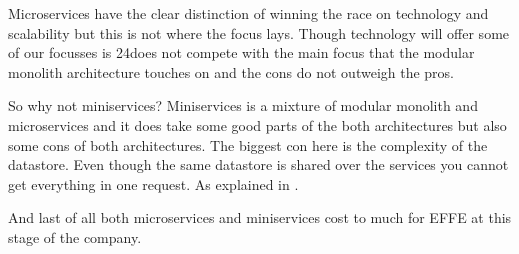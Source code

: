 Microservices have the clear distinction of winning the race on technology and scalability but this is not where the focus lays. Though technology will offer some of our focusses is 24does not compete with the main focus that the modular monolith architecture touches on and the cons do not outweigh the pros.

So why not miniservices? Miniservices is a mixture of modular monolith and microservices and it does take some good parts of the both architectures but also some cons of both architectures. The biggest con here is the complexity of the datastore. Even though the same datastore is shared over the services you cannot get everything in one request. As explained in .

And last of all both microservices and miniservices cost to much for EFFE at this stage of the company.

